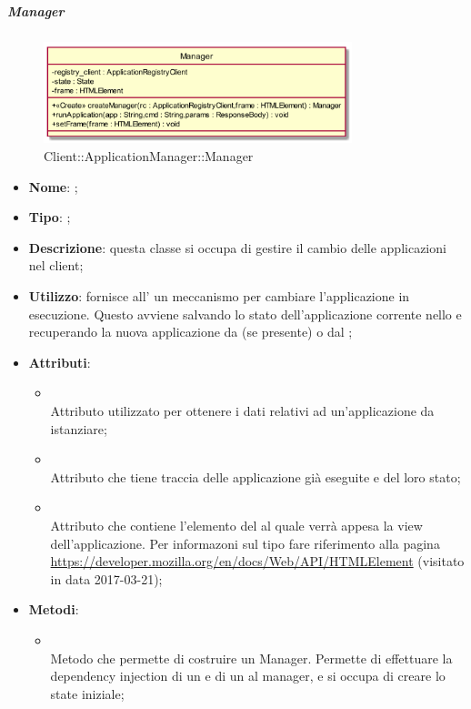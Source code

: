 \hypertarget{Manager_label}{\subparagraph{Manager}}
\begin{figure}[h]
	\centering
	\includegraphics[width=0.80\textwidth,height=\textheight,keepaspectratio]{images/ClassManager.png}
	\caption{Client::ApplicationManager::Manager}
\end{figure}
\begin{itemize}
	\item \textbf{Nome}: ;
	\item \textbf{Tipo}: ;
	\item \textbf{Descrizione}: questa classe si occupa di gestire il cambio delle applicazioni nel client;
	\item \textbf{Utilizzo}: fornisce all' un meccanismo per cambiare l'applicazione in esecuzione. Questo avviene salvando lo stato dell'applicazione corrente nello  e recuperando la nuova applicazione da  (se presente) o dal ;
	\item \textbf{Attributi}:
	\begin{itemize}
		\item[]  \\
		Attributo utilizzato per ottenere i dati relativi ad un'applicazione da istanziare;
		\item[]  \\
		Attributo che tiene traccia delle applicazione già eseguite e del loro stato;
		\item[]  \\
		Attributo che contiene l'elemento del  al quale verrà appesa la view dell'applicazione. Per informazoni sul tipo  fare riferimento alla pagina \url{https://developer.mozilla.org/en/docs/Web/API/HTMLElement}  (visitato in data 2017-03-21);
	\end{itemize}
	\item \textbf{Metodi}:
	\begin{itemize}
		\item[]  \\		Metodo che permette di costruire un Manager. Permette di effettuare la dependency injection di un  e di un  al manager, e si occupa di creare lo state iniziale;\\

\end{itemize}
\end{itemize}
